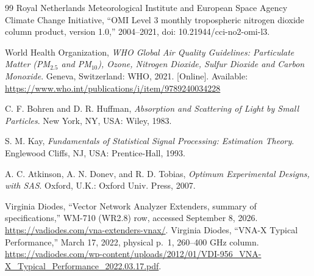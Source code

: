 \documentclass[conference]{IEEEtran}
\begin{document}
\begin{thebibliography}{99}
Royal Netherlands Meteorological Institute and European Space Agency Climate Change Initiative, ``OMI Level 3 monthly tropospheric nitrogen dioxide column product, version 1.0,'' 2004--2021, doi: 10.21944/cci-no2-omi-l3.

World Health Organization, \emph{WHO Global Air Quality Guidelines: Particulate Matter (PM$_{2.5}$ and PM$_{10}$), Ozone, Nitrogen Dioxide, Sulfur Dioxide and Carbon Monoxide}. Geneva, Switzerland: WHO, 2021. [Online]. Available: \url{https://www.who.int/publications/i/item/9789240034228}

C. F. Bohren and D. R. Huffman, \emph{Absorption and Scattering of Light by Small Particles}. New York, NY, USA: Wiley, 1983.

S. M. Kay, \emph{Fundamentals of Statistical Signal Processing: Estimation Theory}. Englewood Cliffs, NJ, USA: Prentice-Hall, 1993.

A. C. Atkinson, A. N. Donev, and R. D. Tobias, \emph{Optimum Experimental Designs, with SAS}. Oxford, U.K.: Oxford Univ. Press, 2007.

 Virginia Diodes, ``Vector Network Analyzer Extenders, summary of specifications,'' WM-710 (WR2.8) row, accessed September 8, 2026. \url{https://vadiodes.com/vna-extenders-vnax/}.
 Virginia Diodes, ``VNA-X Typical Performance,'' March 17, 2022, physical p.~1, 260--400 GHz column. \url{https://vadiodes.com/wp-content/uploads/2012/01/VDI-956_VNA-X_Typical_Performance_2022.03.17.pdf}.
\end{thebibliography}
\end{document}
